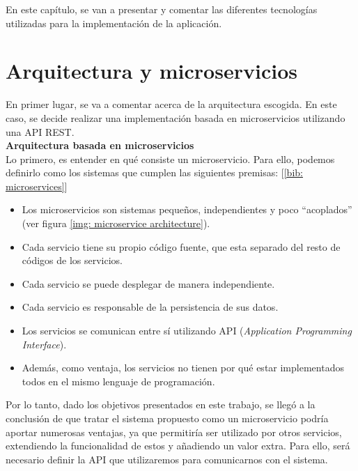 \documentclass[a4paper, oneside, 12pt]{book}
\begin{document}
	\noindent En este capítulo, se van a presentar y comentar las diferentes tecnologías utilizadas para la implementación de la aplicación.
	
	\section{Arquitectura y microservicios}
	
	\noindent En primer lugar, se va a comentar acerca de la arquitectura escogida. En este caso, se decide realizar una implementación basada en microservicios utilizando una API REST. \\
	
	
	\noindent \textbf{\large Arquitectura basada en \textbf{microservicios}} \\
	
	\noindent Lo primero, es entender en qué consiste un microservicio. Para ello, podemos definirlo como los sistemas que cumplen las siguientes premisas: [\ref{bib: microservices}]
	
	\begin{itemize}
		\item Los microservicios son sistemas pequeños, independientes y poco ``acoplados'' (ver figura \ref{img: microservice architecture}).
		
		\item Cada servicio tiene su propio código fuente, que esta separado del resto de códigos de los servicios.
		
		\item Cada servicio se puede desplegar de manera independiente. 
		
		\item Cada servicio es responsable de la persistencia de sus datos.
		
		\item Los servicios se comunican entre sí utilizando API (\textit{Application Programming Interface}).
		
		\item Además, como ventaja, los servicios no tienen por qué estar implementados todos en el mismo lenguaje de programación.
	\end{itemize}

	\noindent Por lo tanto, dado los objetivos presentados en este trabajo, se llegó a la conclusión de que tratar el sistema propuesto como un microservicio podría aportar numerosas ventajas, ya que permitiría ser utilizado por otros servicios, extendiendo la funcionalidad de estos y añadiendo un valor extra. Para ello, será necesario definir la API que utilizaremos para comunicarnos con el sistema.
	
\end{document}
